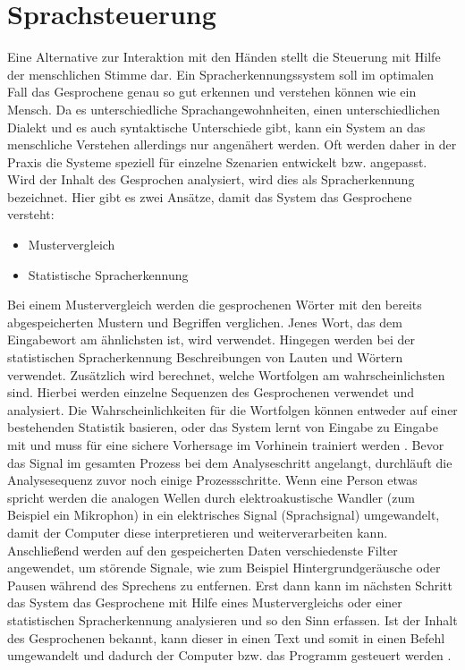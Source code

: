 \section{Sprachsteuerung}
Eine Alternative zur Interaktion mit den Händen stellt die Steuerung mit Hilfe der menschlichen Stimme dar. Ein Spracherkennungssystem soll im optimalen Fall das Gesprochene genau so gut erkennen und verstehen können wie ein Mensch. Da es unterschiedliche Sprachangewohnheiten, einen unterschiedlichen Dialekt und es auch syntaktische Unterschiede gibt, kann ein System an das menschliche Verstehen allerdings nur angenähert werden. Oft werden daher in der Praxis die Systeme speziell für einzelne Szenarien entwickelt bzw. angepasst. 
\newline \newline
Wird der Inhalt des Gesprochen analysiert, wird dies als Spracherkennung bezeichnet. Hier gibt es zwei Ansätze, damit das System das Gesprochene versteht:
\begin{itemize}
      \item Mustervergleich
      \item Statistische Spracherkennung
\end{itemize}
\vspace{\baselineskip}
Bei einem Mustervergleich werden die gesprochenen Wörter mit den bereits abgespeicherten Mustern und Begriffen verglichen. Jenes Wort, das dem Eingabewort am ähnlichsten ist, wird verwendet. Hingegen werden bei der statistischen Spracherkennung Beschreibungen von Lauten und Wörtern verwendet. Zusätzlich wird berechnet, welche Wortfolgen am wahrscheinlichsten sind. Hierbei werden einzelne Sequenzen des Gesprochenen verwendet und analysiert. Die Wahrscheinlichkeiten für die Wortfolgen können entweder auf einer bestehenden Statistik basieren, oder das System lernt von Eingabe zu Eingabe mit und muss für eine sichere Vorhersage im Vorhinein trainiert werden \cite{KaufmannPfisterSprache}. 
\newline \newline
Bevor das Signal im gesamten Prozess bei dem Analyseschritt angelangt, durchläuft die Analysesequenz zuvor noch einige Prozessschritte. Wenn eine Person etwas spricht werden die analogen Wellen durch elektroakustische Wandler (zum Beispiel ein Mikrophon) in ein elektrisches Signal (Sprachsignal) umgewandelt, damit der Computer diese interpretieren und weiterverarbeiten kann. Anschließend werden auf den gespeicherten Daten verschiedenste Filter angewendet, um störende Signale, wie zum Beispiel Hintergrundgeräusche oder Pausen während des Sprechens zu entfernen. Erst dann kann im nächsten Schritt das System das Gesprochene mit Hilfe eines Mustervergleichs oder einer statistischen Spracherkennung analysieren und so den Sinn erfassen. Ist der Inhalt des Gesprochenen bekannt, kann dieser in einen Text und somit in einen Befehl umgewandelt und dadurch der Computer bzw. das Programm gesteuert werden \cite{KaufmannPfisterSprache}.
